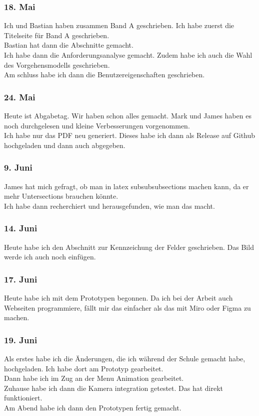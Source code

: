 \documentclass[10pt]{article}
\newcounter{subsubsubsection}[subsubsection]
\begin{document}
	\subsubsection{18. Mai}
	Ich und Bastian haben zusammen Band A geschrieben. Ich habe zuerst die Titelseite für Band A geschrieben.\\
	Bastian hat dann die Abschnitte gemacht.\\
	Ich habe dann die Anforderungsanalyse gemacht. Zudem habe ich auch die Wahl des Vorgehensmodells geschrieben.\\
	Am schluss habe ich dann die Benutzereigenschaften geschrieben.
	\subsubsection{24. Mai}
	Heute ist Abgabetag. Wir haben schon alles gemacht. Mark und James haben es noch durchgelesen und kleine Verbesserungen vorgenommen.\\
	Ich habe nur das PDF neu generiert. Dieses habe ich dann als Release auf Github hochgeladen und dann auch abgegeben.
	\subsubsection{9. Juni}
	James hat mich gefragt, ob man in latex subsubsubsections machen kann, da er mehr Untersections brauchen könnte.\\
	Ich habe dann recherchiert und herausgefunden, wie man das macht.
	\subsubsection{14. Juni}
	Heute habe ich den Abschnitt zur Kennzeichung der Felder geschrieben. Das Bild werde ich auch noch einfügen.\\
	\subsubsection{17. Juni}
	Heute habe ich mit dem Prototypen begonnen. Da ich bei der Arbeit auch Webseiten programmiere, fällt mir das einfacher als das mit Miro oder Figma zu machen.
	\subsubsection{19. Juni}
	Als erstes habe ich die Änderungen, die ich während der Schule gemacht habe, hochgeladen. Ich habe dort am Prototyp gearbeitet.\\
	Dann habe ich im Zug an der Menu Animation gearbeitet.\\
	Zuhause habe ich dann die Kamera integration getestet. Das hat direkt funktioniert.\\
	Am Abend habe ich dann den Prototypen fertig gemacht.
\end{document}
